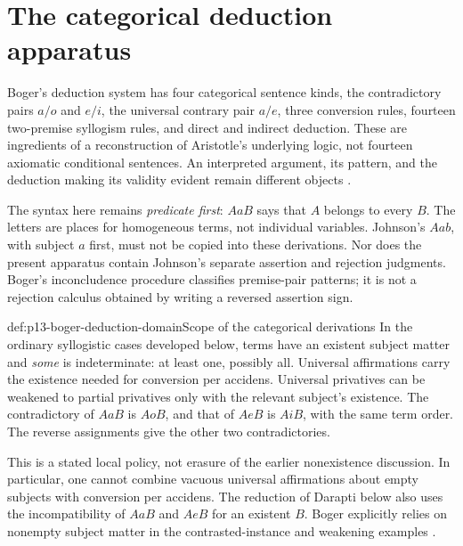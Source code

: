 \section{The categorical deduction apparatus}
\label{sec:p13-boger-deduction}

Boger's deduction system has four categorical sentence kinds, the contradictory
pairs \(a/o\) and \(e/i\), the universal contrary pair \(a/e\), three conversion
rules, fourteen two-premise syllogism rules, and direct and indirect deduction.
These are ingredients of a reconstruction of Aristotle's underlying logic,
not fourteen axiomatic conditional sentences. An interpreted argument, its
pattern, and the deduction making its validity evident remain different objects
\parencite[pp.~166--178]{Boger2004UnderlyingLogic}.

The syntax here remains \emph{predicate first}: \(AaB\) says that \(A\) belongs
to every \(B\). The letters are places for homogeneous terms, not individual
variables. Johnson's \(Aab\), with subject \(a\) first, must not be copied into
these derivations. Nor does the present apparatus contain Johnson's separate
assertion and rejection judgments. Boger's inconcludence procedure classifies
premise-pair patterns; it is not a rejection calculus obtained by writing a
reversed assertion sign.

\begin{hbdefinition}{def:p13-boger-deduction-domain}{Scope of the categorical derivations}
In the ordinary syllogistic cases developed below, terms have an existent
subject matter and \emph{some} is indeterminate: at least one, possibly all.
Universal affirmations carry the existence needed for conversion per accidens.
Universal privatives can be weakened to partial privatives only with the
relevant subject's existence. The contradictory of \(AaB\) is \(AoB\), and
that of \(AeB\) is \(AiB\), with the same term order. The reverse assignments
give the other two contradictories.
\end{hbdefinition}

This is a stated local policy, not erasure of the earlier nonexistence discussion.
In particular, one cannot combine vacuous universal affirmations about empty
subjects with conversion per accidens. The reduction of Darapti below also
uses the incompatibility of \(AaB\) and \(AeB\) for an existent \(B\).
Boger explicitly relies on nonempty subject matter in the contrasted-instance
and weakening examples \parencite[pp.~193--197]{Boger2004UnderlyingLogic}.

